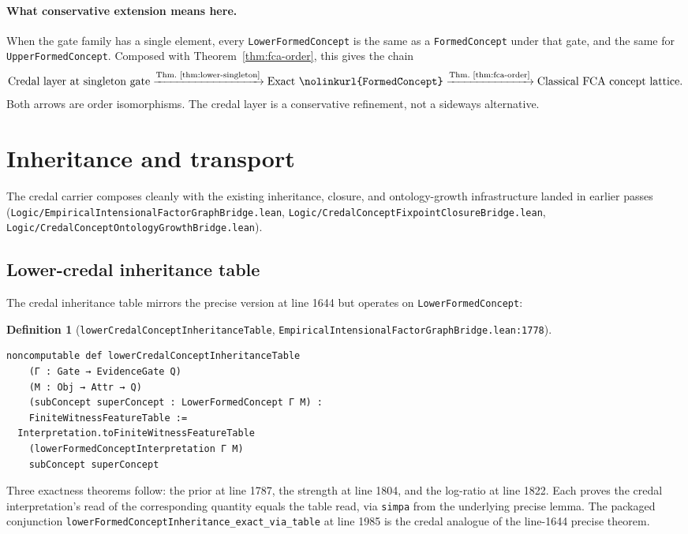 \documentclass[]{article}
\newtheorem{definition}[theorem]{Definition}
\newcommand{\lid}[1]{{\ttfamily\nolinkurl{#1}}}
\newcommand{\lpath}[1]{\texttt{\nolinkurl{#1}}}
\begin{document}
\paragraph{What conservative extension means here.} When the gate family has a
single element, every \lid{LowerFormedConcept} is the same as a \lid{FormedConcept}
under that gate, and the same for \lid{UpperFormedConcept}. Composed with
Theorem~\ref{thm:fca-order}, this gives the chain
\[
  \text{Credal layer at singleton gate}
  \xrightarrow{\text{Thm.~\ref{thm:lower-singleton}}}
  \text{Exact \lid{FormedConcept}}
  \xrightarrow{\text{Thm.~\ref{thm:fca-order}}}
  \text{Classical FCA concept lattice}.
\]
Both arrows are order isomorphisms. The credal layer is a conservative refinement,
not a sideways alternative.

\section{Inheritance and transport}\label{sec:inheritance}

The credal carrier composes cleanly with the existing inheritance, closure, and
ontology-growth infrastructure landed in earlier passes
(\lpath{Logic/EmpiricalIntensionalFactorGraphBridge.lean},
\lpath{Logic/CredalConceptFixpointClosureBridge.lean},
\lpath{Logic/CredalConceptOntologyGrowthBridge.lean}).

\subsection{Lower-credal inheritance table}\label{sec:inheritance-table}

The credal inheritance table mirrors the precise version at line 1644 but operates
on \lid{LowerFormedConcept}:

\begin{definition}[\lid{lowerCredalConceptInheritanceTable},
\lpath{EmpiricalIntensionalFactorGraphBridge.lean:1778}]\label{def:lower-table}
\begin{lstlisting}
noncomputable def lowerCredalConceptInheritanceTable
    (Γ : Gate → EvidenceGate Q)
    (M : Obj → Attr → Q)
    (subConcept superConcept : LowerFormedConcept Γ M) :
    FiniteWitnessFeatureTable :=
  Interpretation.toFiniteWitnessFeatureTable
    (lowerFormedConceptInterpretation Γ M)
    subConcept superConcept
\end{lstlisting}
\end{definition}

\noindent Three exactness theorems follow: the prior at line 1787, the strength at
line 1804, and the log-ratio at line 1822. Each proves the credal interpretation's
read of the corresponding quantity equals the table read, via \lid{simpa} from the
underlying precise lemma. The packaged conjunction
\lid{lowerFormedConceptInheritance\_exact\_via\_table} at line 1985 is the credal
analogue of the line-1644 precise theorem.
\end{document}
